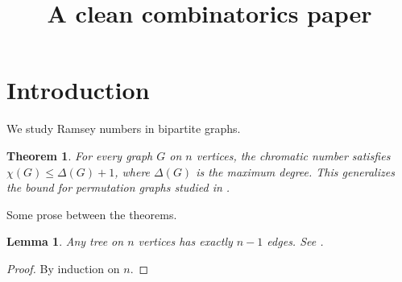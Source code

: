 \documentclass{article}
\title{A clean combinatorics paper}
\newtheorem{theorem}{Theorem}
\newtheorem{lemma}{Lemma}
\begin{document}
\section{Introduction}
We study Ramsey numbers in bipartite graphs.

\begin{theorem}\label{thm:main}
For every graph $G$ on $n$ vertices, the chromatic number satisfies
$\chi(G) \le \Delta(G) + 1$, where $\Delta(G)$ is the maximum degree.
This generalizes the bound for permutation graphs studied in \cite{Smith2019, Doe2020}.
\end{theorem}

Some prose between the theorems.

\begin{lemma}\label{lem:bound}
Any tree on $n$ vertices has exactly $n-1$ edges. See \cite{Bollobas}.
\end{lemma}

\begin{proof}
By induction on $n$.
\end{proof}
\end{document}
